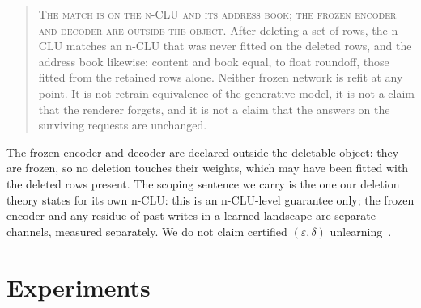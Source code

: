 \documentclass{article} %
\begin{document}
\begin{quote}
\textsc{The match is on the n-CLU and its address book; the frozen encoder and decoder are outside
the object.} After deleting a set of rows, the n-CLU matches an n-CLU that was never fitted on the
deleted rows, and the address book likewise: content and book equal, to float roundoff, those fitted
from the retained rows alone. Neither frozen network is refit at any point. It is
not retrain-equivalence of the generative model, it is not a claim that the renderer forgets, and it
is not a claim that the answers on the surviving requests are unchanged.
\end{quote}

\noindent The frozen encoder and decoder are declared outside the deletable object: they are
frozen, so no deletion touches their weights, which may have been fitted with the deleted rows
present.
The scoping sentence we carry is the one our deletion theory states for its own n-CLU: this is
an n-CLU-level guarantee only; the frozen encoder and any residue of past writes in a learned
landscape are separate channels, measured separately. We do not claim certified
$(\varepsilon,\delta)$ unlearning~\citep{guo_certified_2023}. %

\section{Experiments}
\label{sec:experiments}
\end{document}
